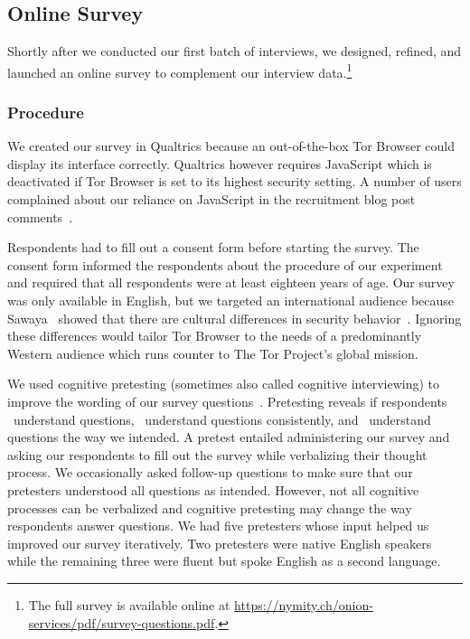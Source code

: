 \subsection{Online Survey}
\label{sec:online-survey}

Shortly after we conducted our first batch of interviews, we designed, refined,
and launched an online survey to complement our interview data.\footnote{The
full survey is available online at
\url{https://nymity.ch/onion-services/pdf/survey-questions.pdf}.}

\subsubsection{Procedure}

We created our survey in Qualtrics because an out-of-the-box Tor Browser
could display its interface correctly.  Qualtrics however requires JavaScript
which is deactivated if Tor Browser is set to its highest security setting.  A
number of users complained about our reliance on JavaScript in the recruitment
blog post comments~\cite{Winter2017a}.

Respondents had to fill out a consent form before starting the survey. The
consent form informed the respondents about the procedure of our experiment and
required that all respondents were at least eighteen years of age.  Our survey
was only available in English, but we targeted an international audience because
Sawaya \ea\ showed that there are cultural differences in security
behavior~\cite{Sawaya2017a}.  Ignoring these differences would tailor Tor
Browser to the needs of a predominantly Western audience which runs counter to
The Tor Project's global mission.

We used cognitive pretesting (sometimes also called cognitive interviewing) to
improve the wording of our survey questions~\cite{Collins2003a}.  Pretesting
reveals if respondents \first~understand questions, \second~understand questions
consistently, and \third~understand questions the way we intended.  A pretest
entailed administering our survey and asking our respondents to fill out the
survey while verbalizing their thought process.  We occasionally asked follow-up
questions to make sure that our pretesters understood all questions as intended.
However, not all cognitive processes can be verbalized and cognitive pretesting
may change the way respondents answer questions.  We had five pretesters whose
input helped us improved our survey iteratively.  Two pretesters were native
English speakers while the remaining three were fluent but spoke English as a
second language.

